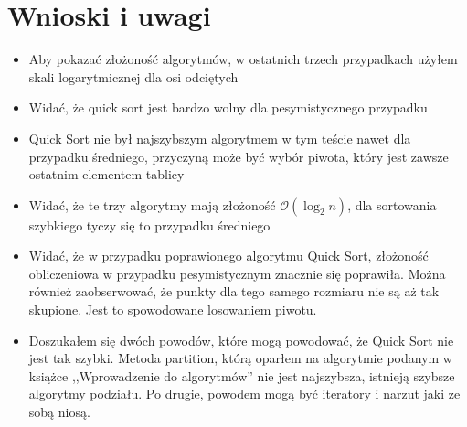 \documentclass[10pt,a4paper]{article}
\begin{document}
\section{Wnioski i uwagi}

\begin{itemize}
	\item Aby pokazać złożoność algorytmów, w ostatnich trzech przypadkach użyłem
		skali logarytmicznej dla osi odciętych
	\item Widać, że quick sort jest bardzo wolny dla pesymistycznego przypadku
	\item Quick Sort nie był najszybszym algorytmem w tym teście nawet dla przypadku średniego,
	 przyczyną może być wybór piwota, który jest zawsze ostatnim elementem tablicy
	 \item Widać, że te trzy algorytmy mają złożoność $\mathcal{O}(\log_2 n)$, dla
	 sortowania szybkiego tyczy się to przypadku średniego
	 \item Widać, że w przypadku poprawionego algorytmu Quick Sort, złożoność obliczeniowa w
	 przypadku pesymistycznym znacznie się poprawiła. Można również zaobserwować, że punkty
	 dla tego samego rozmiaru nie są aż tak skupione. Jest to spowodowane losowaniem piwotu.
	\item Doszukałem się dwóch powodów, które mogą powodować, że Quick 
	Sort nie jest tak szybki. Metoda partition, którą oparłem na 
	algorytmie podanym w książce ,,Wprowadzenie do algorytmów'' 
	nie jest najszybsza, istnieją szybsze algorytmy podziału.
	Po drugie, powodem mogą być iteratory i narzut jaki ze sobą niosą.
\end{itemize}
\end{document}
